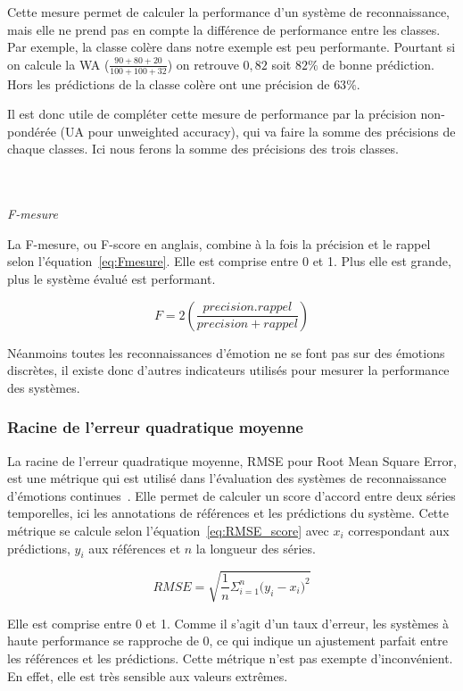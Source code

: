 Cette mesure permet de calculer la performance d'un système de reconnaissance, mais elle ne prend pas en compte la différence de performance entre les classes. Par exemple, la classe colère dans notre exemple est peu performante. Pourtant si on calcule la WA ($\frac{90+80+20}{100+100+32}$) on retrouve $0,82$ soit $82\%$ de bonne prédiction. Hors les prédictions de la classe colère ont une précision de $63\%$.

Il est donc utile de compléter cette mesure de performance par la précision non-pondérée (UA pour unweighted accuracy), qui va faire la somme des précisions de chaque classes. Ici nous ferons la somme des précisions des trois classes.

\\
\\
\textit{F-mesure}

La F-mesure, ou F-score en anglais, combine à la fois la précision et le rappel selon l'équation~\ref{eq:Fmesure}. Elle est comprise entre 0 et 1. Plus elle est grande, plus le système évalué est performant.

\begin{equation}
  F = 2 \left( \frac{precision.rappel}{precision+rappel} \right)
  \label{eq:Fmesure}
\end{equation}

Néanmoins toutes les reconnaissances d'émotion ne se font pas sur des émotions discrètes, il existe donc d'autres indicateurs utilisés pour mesurer la performance des systèmes.

\subsubsection{Racine de l'erreur quadratique moyenne}
La racine de l'erreur quadratique moyenne, RMSE pour Root Mean Square Error, est une métrique qui est utilisé dans l'évaluation des systèmes de reconnaissance d'émotions continues~\cite{AVEC2017}. Elle permet de calculer un score d'accord entre deux séries temporelles, ici les annotations de références et les prédictions du système. Cette métrique se calcule selon l'équation~\ref{eq:RMSE_score} avec $x_i$ correspondant aux prédictions, $y_i$ aux références et $n$ la longueur des séries.

\begin{equation}
    RMSE = \sqrt{\frac{1}{n}\Sigma_{i=1}^{n}{\Big(y_i - x_i\Big)^2}}
\label{eq:RMSE_score}
\end{equation}

Elle est comprise entre 0 et 1. Comme il s'agit d'un taux d'erreur, les systèmes à haute performance se rapproche de 0, ce qui indique un ajustement parfait entre les références et les prédictions. Cette métrique n'est pas exempte d'inconvénient. En effet, elle est très sensible aux valeurs extrêmes.

